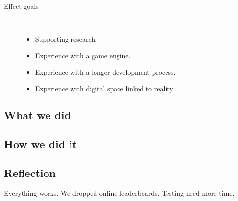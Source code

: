 \begin{description}
	\item[Effect goals]\ 
	\begin{itemize}
		\item Supporting research.
		\item Experience with a game engine.
		\item Experience with a longer development process.
		\item Experience with digital space linked to reality
	\end{itemize}
\end{description}


\subsection{What we did}

\subsection{How we did it}

\subsection{Reflection}
Everything works.
We dropped online leaderboards.
Testing need more time.